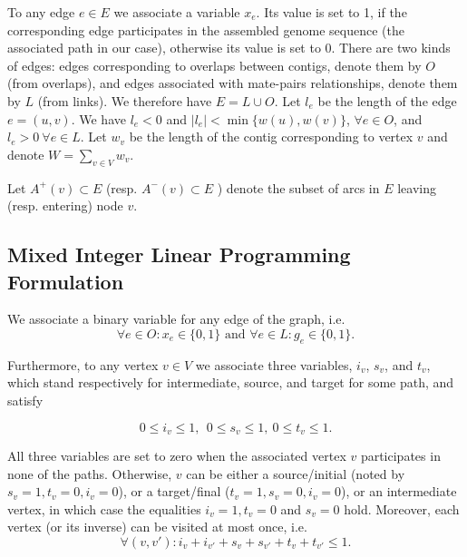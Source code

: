 \documentclass{endmH}
\begin{document}
To any edge $e\in E$ we associate a variable $x_e$.  Its value is set to 1, if the corresponding  edge participates in the assembled genome sequence (the associated path in our case), otherwise its value is set to 0. 
 There are two kinds of edges: edges corresponding to overlaps between contigs, denote them by $O$ (from overlaps), and edges associated with mate-pairs relationships, denote them by $L$ (from  links).  We therefore  have $E=L \cup O$.  Let $l_e$ be the length of the edge $e=(u,v)$.  We have $l_e < 0$ and $|l_e|< \min{\{w(u),w(v)}\}$,  $\forall e \in O$, and  $l_e > 0  ~\forall e \in L$.  Let  $w_v$ be the length of the contig corresponding to vertex $v$ and denote $W= \sum_{v \in V} w_v$. %



Let $A^+(v) \subset E $ (resp. $A^-(v) \subset E  $ ) denote  the subset  of arcs in $E$ leaving (resp. entering)  node $v$. 

\subsection{Mixed Integer Linear Programming Formulation} %
\label{sub:first step model}

                   
We  associate a binary variable for any edge of the graph, i.e.
   \begin{equation}\label{binary_edges}
    \forall e \in O:  x_e \in \{0,1\} \mbox{ and } \forall e \in L:  g_e \in \{0,1\}. 
   \end{equation}
   
 Furthermore, to any vertex $v\in V$ we associate three variables,  $i_v$, $s_v$, and $t_v$, which stand respectively for intermediate, source, and target for some path, and satisfy

  \begin{equation}\label{reals}
  0 \leq i_v \leq 1, ~~ 0 \leq s_v \leq 1, ~ 0 \leq t_v \leq  1.
 \end{equation}
 
 All three variables are set to zero when the associated vertex $v$ participates in none of the paths. 
 Otherwise, $v$ can be  either a source/initial (noted by $s_v=1, t_v=0, i_v=0$), or a target/final ($t_v=1,  s_v=0, i_v=0$), or an intermediate vertex, in which case the equalities $i_v=1, t_v=0$ and $s_v=0$ hold.  Moreover, each vertex (or its inverse) can  be visited  at most once, i.e.
                   \begin{equation}\label{at_most_one}
                   \forall (v,v') :  i_v+i_{v'} + s_v+s_{v'} + t_v+t_{v'} \leq 1.
                   \end{equation}
\end{document}
